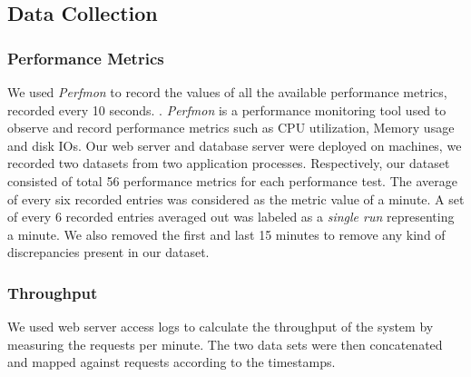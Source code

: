 \subsection{Data Collection}
\subsubsection{Performance Metrics}
We used \textit{Perfmon}\cite{perfmon} to record the values of all the available performance metrics, recorded every 10 seconds. \cite{windowsperfmon}\cite{perfmon}. \textit{Perfmon} is a performance monitoring tool used to observe and record performance metrics such as CPU utilization, Memory usage and disk IOs. Our web server and database server were deployed on machines, we recorded two datasets from two application processes. Respectively, our dataset consisted of total 56 performance metrics for each performance test. The average of every six recorded entries was considered as the metric value of a minute. A set of every 6 recorded entries averaged out was labeled as a \textit{single run} representing a minute. We also removed the first and last 15 minutes to remove any kind of discrepancies present in our dataset.
\subsubsection{Throughput}
We used web server access logs to calculate the throughput of the system by measuring the requests per minute. The two data sets were then concatenated and mapped against requests according to the timestamps.

